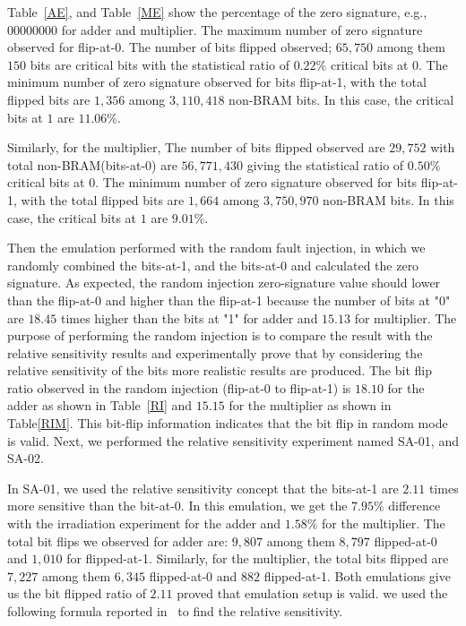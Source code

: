 Table~\ref{AE}, and Table~\ref{ME} show the percentage of the zero signature, e.g., $00000000$ for adder and multiplier. The maximum number of zero signature observed for flip-at-0. The number of bits flipped observed; $65,750$ among them $150$ bits are critical bits with the statistical ratio of $0.22\%$ critical bits at $0$. The minimum number of zero signature observed for bits flip-at-1, with the total flipped bits are $1,356$ among $3,110,418$ non-BRAM bits. In this case, the critical bits at $1$ are $11.06\%$. 

Similarly, for the multiplier,  The number of bits flipped observed are $29,752$ with total non-BRAM(bits-at-0) are $56,771,430$ giving the statistical ratio of $0.50\%$ critical bits at $0$. The minimum number of zero signature observed for bits flip-at-1, with the total flipped bits are $1,664$ among $3,750,970$ non-BRAM bits. In this case, the critical bits at $1$ are $9.01\%$.


Then the emulation performed with the random fault injection, in which we randomly combined the bits-at-1, and the bits-at-0 and calculated the zero signature. As expected, the random injection zero-signature value should lower than the flip-at-0 and higher than the flip-at-1 because the number of bits at "0" are $18.45$ times higher than the bits at "1" for adder and  $15.13$ for multiplier. The purpose of performing the random injection is to compare the result with the relative sensitivity results and experimentally prove that by considering the relative sensitivity of the bits more realistic results are produced. The bit flip ratio observed in the random injection (flip-at-0 to flip-at-1) is $18.10$ for the adder as shown in Table~\ref{RI} and $15.15$ for the multiplier as shown in Table\ref{RIM}. This bit-flip information indicates that the bit flip in random mode is valid. Next, we performed the relative sensitivity experiment named SA-01, and SA-02.

In SA-01, we used the relative sensitivity concept that the  bits-at-1 are $2.11$ times more sensitive than the bit-at-0. In this emulation, we get the $7.95\%$ difference with the irradiation experiment for the adder and $1.58\%$ for the multiplier. The total bit flips we observed for adder are: $9,807$ among them $8,797$ flipped-at-0 and $1,010$ for flipped-at-1. Similarly, for the multiplier, the total bits flipped are $7,227$ among them $6,345$ flipped-at-0 and $882$ flipped-at-1. Both emulations give us the bit flipped ratio of $2.11$ proved that emulation setup is valid. we used the following formula reported in~\cite{bocquillon2009evaluation} to find the relative sensitivity.


